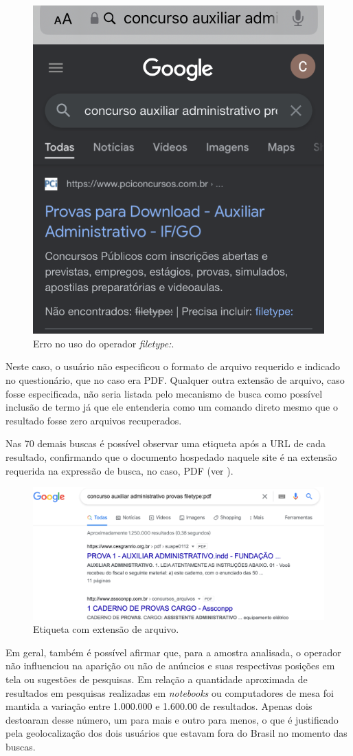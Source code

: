 \documentclass[portuguese]{textolivre}
\begin{document}
\begin{figure}[h!]
    \centering
    \includegraphics[width=0.5\linewidth]{fig-015.png}
    \caption{Erro no uso do operador \textit{filetype:}.}
    \label{fig19}
\end{figure}

Neste caso, o usuário não especificou o formato de arquivo requerido e indicado no questionário, que no caso era PDF. Qualquer outra extensão de arquivo, caso fosse especificada, não seria listada pelo mecanismo de busca como possível inclusão de termo já que ele entenderia como um comando direto mesmo que o resultado fosse zero arquivos recuperados.

Nas 70 demais buscas é possível observar uma etiqueta após a URL de cada resultado, confirmando que o documento hospedado naquele site é na extensão requerida na expressão de busca, no caso, PDF (ver ).

\begin{figure}[h!]
    \centering
    \includegraphics[width=0.6\linewidth]{fig-016.png}
    \caption{Etiqueta com extensão de arquivo.}
    \label{fig20}
\end{figure}

Em geral, também é possível afirmar que, para a amostra analisada, o operador não influenciou na aparição ou não de anúncios e suas respectivas posições em tela ou sugestões de pesquisas. Em relação a quantidade aproximada de resultados em pesquisas realizadas em \textit{notebooks} ou computadores de mesa foi mantida a variação entre 1.000.000 e 1.600.00 de resultados. Apenas dois destoaram desse número, um para mais e outro para menos, o que é justificado pela geolocalização dos dois usuários que estavam fora do Brasil no momento das buscas.
\end{document}
